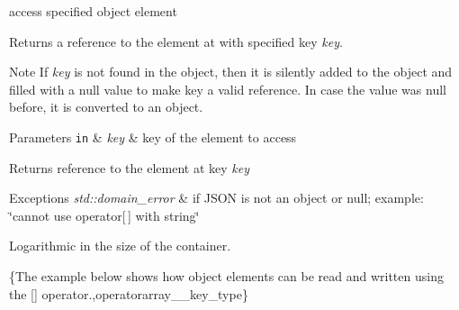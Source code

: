 access specified object element 

Returns a reference to the element at with specified key {\itshape key}.

\begin{DoxyNote}{Note}
If {\itshape key} is not found in the object, then it is silently added to the object and filled with a {\ttfamily null} value to make {\ttfamily key} a valid reference. In case the value was {\ttfamily null} before, it is converted to an object.
\end{DoxyNote}

\begin{DoxyParams}[1]{Parameters}
\mbox{\tt in}  & {\em key} & key of the element to access\\
\hline
\end{DoxyParams}
\begin{DoxyReturn}{Returns}
reference to the element at key {\itshape key} 
\end{DoxyReturn}

\begin{DoxyExceptions}{Exceptions}
{\em std\-::domain\-\_\-error} & if J\-S\-O\-N is not an object or null; example\-: {\ttfamily \char`\"{}cannot use operator\mbox{[}$\,$\mbox{]} with string\char`\"{}}\\
\hline
\end{DoxyExceptions}
Logarithmic in the size of the container.

\{The example below shows how object elements can be read and written using the {\ttfamily \mbox{[}\mbox{]}} operator.,operatorarray\-\_\-\-\_\-key\-\_\-type\}

